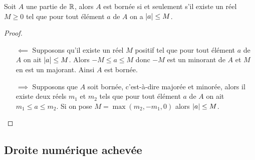 \begin{prop}
  Soit $A$ une partie de $\mathbb{R}$, alors $A$ est bornée si et seulement s'il existe un réel $M\geq 0$ tel que pour tout élément $a$ de $A$ on a $\left\lvert a\right\rvert\leq M$.
\end{prop}
\begin{proof}
  \begin{itemize}
  \item[$\impliedby$] Supposons qu'il existe un réel $M$ positif tel que pour tout élément $a$ de $A$ on ait $\left\lvert a\right\rvert\leq M$. Alors $-M\leq a\leq M$ donc $-M$ est un minorant de $A$ et $M$ en est un majorant. Ainsi $A$ est bornée.
  \item[$\implies$] Supposons que $A$ soit bornée, c'est-à-dire majorée et minorée, alors il existe deux réels $m_1$ et $m_2$ tels que pour tout élément $a$ de $A$ on ait $m_1\leq a\leq m_2$. Si on pose $M=\max(m_2,-m_1,0)$ alors $\left\lvert a\right\rvert\leq M$.
  \end{itemize}
\end{proof}

\subsection{Droite numérique achevée}

